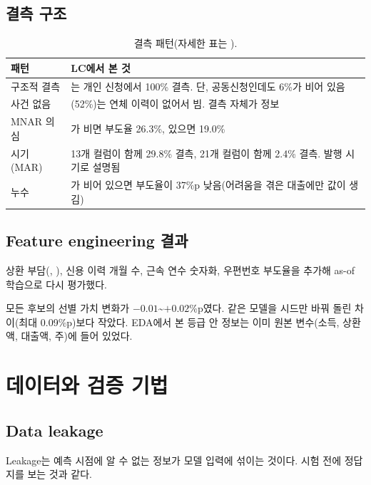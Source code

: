 \section{결측 구조}
\begin{table}[H]\centering\small
\begin{tabularx}{\linewidth}{@{}lL@{}}\toprule
패턴 & LC에서 본 것\\\midrule
구조적 결측 & 는 개인 신청에서 100\% 결측. 단, 공동신청인데도 6\%가 비어 있음\\
사건 없음 & (52\%)는 연체 이력이 없어서 빔. 결측 자체가 정보\\
MNAR 의심 & 가 비면 부도율 26.3\%, 있으면 19.0\%\\
시기(MAR) & 13개 컬럼이 함께 29.8\% 결측, 21개 컬럼이 함께 2.4\% 결측. 발행 시기로 설명됨\\
누수 & 가 비어 있으면 부도율이 37\%p 낮음(어려움을 겪은 대출에만 값이 생김)\\\bottomrule
\end{tabularx}
\caption{결측 패턴(자세한 표는 ).}
\end{table}

\section{Feature engineering 결과}
상환 부담(, ), 신용 이력 개월 수, 근속 연수 숫자화, 우편번호 부도율을 추가해 as-of 학습으로 다시 평가했다.

\begin{warnbox}[결과: 모두 기각]
모든 후보의 선별 가치 변화가 $-0.01$\textasciitilde $+0.02$\%p였다. 같은 모델을 시드만 바꿔 돌린 차이(최대 0.09\%p)보다 작았다. EDA에서 본 등급 안 정보는 이미 원본 변수(소득, 상환액, 대출액, 주)에 들어 있었다.
\end{warnbox}

\chapter{데이터와 검증 기법}

\section{Data leakage}
\begin{keybox}[정의]
Leakage는 예측 시점에 알 수 없는 정보가 모델 입력에 섞이는 것이다. 시험 전에 정답지를 보는 것과 같다.
\end{keybox}

